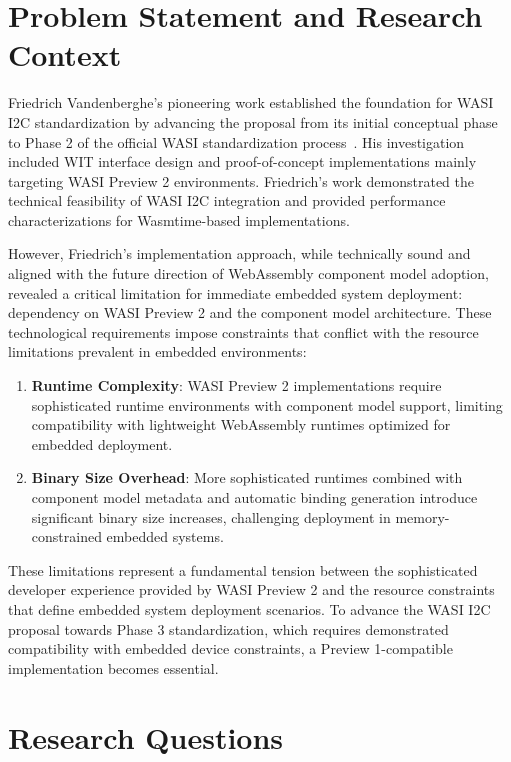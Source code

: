\section{Problem Statement and Research Context}
\label{sec:problem-statement}

Friedrich Vandenberghe's pioneering work established the foundation for WASI I2C standardization by advancing the proposal from its initial conceptual phase to Phase 2 of the official WASI standardization process~\cite{friedrich_thesis}. His investigation included WIT interface design and proof-of-concept implementations mainly targeting WASI Preview 2 environments. Friedrich's work demonstrated the technical feasibility of WASI I2C integration and provided performance characterizations for Wasmtime-based implementations.

However, Friedrich's implementation approach, while technically sound and aligned with the future direction of WebAssembly component model adoption, revealed a critical limitation for immediate embedded system deployment: dependency on WASI Preview 2 and the component model architecture. These technological requirements impose constraints that conflict with the resource limitations prevalent in embedded environments:

\begin{enumerate}
    \item \textbf{Runtime Complexity}: WASI Preview 2 implementations require sophisticated runtime environments with component model support, limiting compatibility with lightweight WebAssembly runtimes optimized for embedded deployment.
    
    \item \textbf{Binary Size Overhead}: More sophisticated runtimes combined with component model metadata and automatic binding generation introduce significant binary size increases, challenging deployment in memory-constrained embedded systems.
\end{enumerate}

These limitations represent a fundamental tension between the sophisticated developer experience provided by WASI Preview 2 and the resource constraints that define embedded system deployment scenarios. To advance the WASI I2C proposal towards Phase 3 standardization, which requires demonstrated compatibility with embedded device constraints, a Preview 1-compatible implementation becomes essential.




\section{Research Questions}
\label{sec:research-questions}


